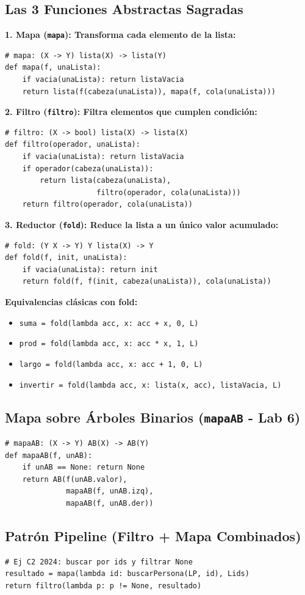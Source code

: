 \documentclass[8pt,twocolumn]{extarticle}
\begin{document}
\subsection{Las 3 Funciones Abstractas Sagradas}
\textbf{1. Mapa (\texttt{mapa}): Transforma cada elemento de la lista:}
\begin{verbatim}
# mapa: (X -> Y) lista(X) -> lista(Y)
def mapa(f, unaLista):
    if vacia(unaLista): return listaVacia
    return lista(f(cabeza(unaLista)), mapa(f, cola(unaLista)))
\end{verbatim}
\textbf{2. Filtro (\texttt{filtro}): Filtra elementos que cumplen condición:}
\begin{verbatim}
# filtro: (X -> bool) lista(X) -> lista(X)
def filtro(operador, unaLista):
    if vacia(unaLista): return listaVacia
    if operador(cabeza(unaLista)):
        return lista(cabeza(unaLista),
                     filtro(operador, cola(unaLista)))
    return filtro(operador, cola(unaLista))
\end{verbatim}
\textbf{3. Reductor (\texttt{fold}): Reduce la lista a un único valor acumulado:}
\begin{verbatim}
# fold: (Y X -> Y) Y lista(X) -> Y
def fold(f, init, unaLista):
    if vacia(unaLista): return init
    return fold(f, f(init, cabeza(unaLista)), cola(unaLista))
\end{verbatim}
\textbf{Equivalencias clásicas con fold:}
\begin{itemize}
    \item \texttt{suma = fold(lambda acc, x: acc + x, 0, L)}
    \item \texttt{prod = fold(lambda acc, x: acc * x, 1, L)}
    \item \texttt{largo = fold(lambda acc, x: acc + 1, 0, L)}
    \item \texttt{invertir = fold(lambda acc, x: lista(x, acc), listaVacia, L)}
\end{itemize}

\subsection{Mapa sobre Árboles Binarios (\texttt{mapaAB} - Lab 6)}
\begin{verbatim}
# mapaAB: (X -> Y) AB(X) -> AB(Y)
def mapaAB(f, unAB):
    if unAB == None: return None
    return AB(f(unAB.valor),
              mapaAB(f, unAB.izq),
              mapaAB(f, unAB.der))
\end{verbatim}

\subsection{Patrón Pipeline (Filtro + Mapa Combinados)}
\begin{verbatim}
# Ej C2 2024: buscar por ids y filtrar None
resultado = mapa(lambda id: buscarPersona(LP, id), Lids)
return filtro(lambda p: p != None, resultado)
\end{verbatim}
\end{document}
